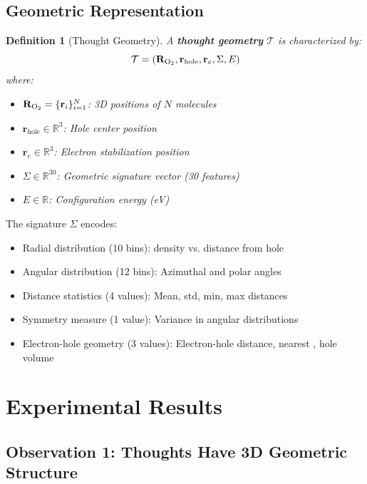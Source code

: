 \documentclass[11pt]{article}
\newtheorem{definition}[theorem]{Definition}
\theoremstyle{remark}
\begin{document}
\subsection{Geometric Representation}

\begin{definition}[Thought Geometry]
\label{def:thought_geometry_experimental}
A \textbf{thought geometry} $\mathcal{T}$ is characterized by:
\begin{equation}
\mathcal{T} = (\mathbf{R}_{\ce{O2}}, \mathbf{r}_{\text{hole}}, \mathbf{r}_e, \Sigma, E)
\end{equation}
where:
\begin{itemize}
\item $\mathbf{R}_{\ce{O2}} = \{\mathbf{r}_i\}_{i=1}^{N}$: 3D positions of $N$  molecules
\item $\mathbf{r}_{\text{hole}} \in \mathbb{R}^3$: Hole center position
\item $\mathbf{r}_e \in \mathbb{R}^3$: Electron stabilization position
\item $\Sigma \in \mathbb{R}^{30}$: Geometric signature vector (30 features)
\item $E \in \mathbb{R}$: Configuration energy (eV)
\end{itemize}
\end{definition}

The signature $\Sigma$ encodes:
\begin{itemize}
\item Radial distribution (10 bins):  density vs. distance from hole
\item Angular distribution (12 bins): Azimuthal and polar angles
\item Distance statistics (4 values): Mean, std, min, max distances
\item Symmetry measure (1 value): Variance in angular distributions
\item Electron-hole geometry (3 values): Electron-hole distance, nearest , hole volume
\end{itemize}

\section{Experimental Results}

\subsection{Observation 1: Thoughts Have 3D Geometric Structure}
\end{document}
